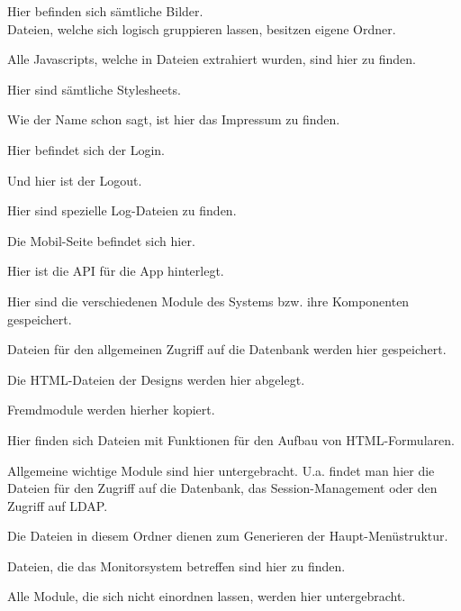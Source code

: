\begin{description}[style=nextline]
\begin{description}[style=nextline]
					Hier befinden sich sämtliche Bilder.\\
					Dateien, welche sich logisch gruppieren lassen, besitzen eigene Ordner.
				\item[./scripts/]
					Alle Javascripts, welche in Dateien extrahiert wurden, sind hier zu finden.
				\item[./styles/]
					Hier sind sämtliche Stylesheets.	
			\end{description}
		\item[/impressum/]
			Wie der Name schon sagt, ist hier das Impressum zu finden.
		\item[/login/]
			Hier befindet sich der Login.
		\item[/logout/]
			Und hier ist der Logout.
		\item[/logs/]
			Hier sind spezielle Log-Dateien zu finden.
		\item[/mobile/]
			Die Mobil-Seite befindet sich hier.
			\begin{description}[style=nextline]
				\item[./api/]
					Hier ist die API für die App hinterlegt.
			\end{description}
		\item[/modules/]
			Hier sind die verschiedenen Module des Systems bzw. ihre Komponenten  gespeichert.
			\begin{description}[style=nextline]
				\item[./datebase/]
					Dateien für den allgemeinen Zugriff auf die Datenbank werden hier gespeichert.
				\item[./design/]
					Die HTML-Dateien der Designs werden hier abgelegt.
				\item[./external/]
					Fremdmodule werden hierher kopiert.
				\item[./form/]
					Hier finden sich Dateien mit Funktionen für den Aufbau von HTML-Formularen.
				\item[./general/]
					Allgemeine wichtige Module sind hier untergebracht. U.a. findet man hier die Dateien für den Zugriff auf die Datenbank, das Session-Management oder den Zugriff auf LDAP.
				\item[./menu/]
					Die Dateien in diesem Ordner dienen zum Generieren der Haupt-Menüstruktur.
				\item[./monitors/]
					Dateien, die das Monitorsystem betreffen sind hier zu finden.
				\item[./other/]
					Alle Module, die sich nicht einordnen lassen, werden hier untergebracht.
			\end{description}

\end{description}
